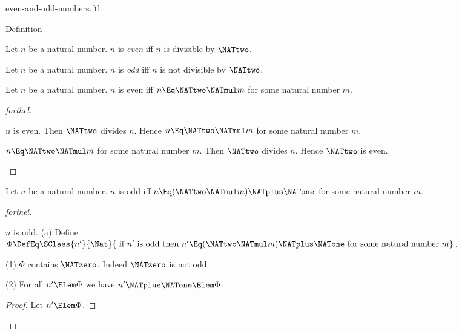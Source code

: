 \documentclass{stex}
\begin{document}
\begin{smodule}{even-and-odd-numbers.ftl}

\begin{sfragment}{Definition}
  \begin{definition}[forthel,for=even]
    Let $n$ be a natural number.
    $n$ is \emph{even} iff $n$ is divisible by $\NATtwo$.
  \end{definition}

  \begin{definition}[forthel,for=odd]
    Let $n$ be a natural number.
    $n$ is \emph{odd} iff $n$ is not divisible by $\NATtwo$.
  \end{definition}

  \begin{proposition}[forthel]
    Let $n$ be a natural number.
    $n$ is even iff $n \Eq \NATtwo \NATmul m$ for some natural number $m$.
  \end{proposition}
  \begin{proof}[forthel]
    \begin{case}{$n$ is even.}
      Then $\NATtwo$ divides $n$.
      Hence $n \Eq \NATtwo \NATmul m$ for some natural number $m$.
    \end{case}

    \begin{case}{$n \Eq \NATtwo \NATmul m$ for some natural number $m$.}
      Then $\NATtwo$ divides $n$.
      Hence $\NATtwo$ is even.
    \end{case}
  \end{proof}

  \begin{proposition}[forthel]
    Let $n$ be a natural number.
    $n$ is odd iff $n \Eq (\NATtwo \NATmul m) \NATplus \NATone$ for some natural number $m$.
  \end{proposition}
  \begin{proof}[forthel]
    \begin{case}{$n$ is odd.}
      (a) Define $\Phi \DefEq \SClass{n'}{\Nat}{\text{ if }n'\text{ is odd then }n' \Eq (\NATtwo \NATmul m) \NATplus \NATone\text{ for some natural number }m}$.

      (1) $\Phi$ contains $\NATzero$.
      Indeed $\NATzero$ is not odd.

      (2) For all $n' \Elem \Phi$ we have $n' \NATplus \NATone \Elem \Phi$. 
      \begin{proof}
        Let $n' \Elem \Phi$.


\end{proof}
\end{case}
\end{proof}
\end{sfragment}
\end{smodule}
\end{document}
